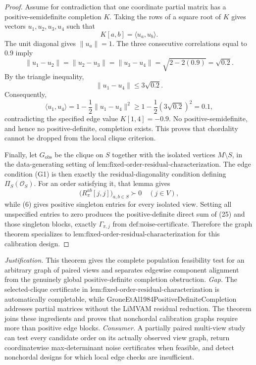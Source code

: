 \documentclass{article}
\begin{document}
\begin{proof}
Assume for contradiction that one coordinate partial matrix has a positive-semidefinite completion \(K\).  Taking the rows of a square root of \(K\) gives vectors \(u_1,u_2,u_3,u_4\) such that
\[
K[a,b]=\langle u_a,u_b\rangle.
\tag{21}
\]
The unit diagonal gives \(\lVert u_a\rVert=1\).  The three consecutive correlations equal to \(0.9\) imply
\[
\lVert u_1-u_2\rVert
=\lVert u_2-u_3\rVert
=\lVert u_3-u_4\rVert
=\sqrt{2-2(0.9)}=\sqrt{0.2}.
\tag{22}
\]
By the triangle inequality,
\[
\lVert u_1-u_4\rVert\le3\sqrt{0.2}.
\tag{23}
\]
Consequently,
\[
\langle u_1,u_4\rangle
=1-\frac12\lVert u_1-u_4\rVert^2
\ge 1-\frac12(3\sqrt{0.2})^2
=0.1,
\tag{24}
\]
contradicting the specified edge value \(K[1,4]=-0.9\).  No positive-semidefinite, and hence no positive-definite, completion exists.  This proves that chordality cannot be dropped from the local clique criterion.

Finally, let \(G_{\mathrm{obs}}\) be the clique on \(S\) together with the isolated vertices \(M\setminus S\), in the data-generating setting of \(\text{lem:fixed-order-residual-characterization}\).  The edge condition (G1) is then exactly the residual-diagonality condition defining \(\Pi_S(\mathcal O_S)\).  For an order satisfying it, that lemma gives
\[
\bigl(R_\pi^{ab}[j,j]\bigr)_{a,b\in S}\succ0
\quad(j\in V),
\tag{25}
\]
while (6) gives positive singleton entries for every isolated view.  Setting all unspecified entries to zero produces the positive-definite direct sum of (25) and those singleton blocks, exactly \(\Gamma_{\pi,j}\) from \(\text{def:noise-certificate}\).  Therefore the graph theorem specializes to \(\text{lem:fixed-order-residual-characterization}\) for this calibration design.
\end{proof}
\par\smallskip\noindent \textit{Justification.} This theorem gives the complete population feasibility test for an arbitrary graph of paired views and separates edgewise component alignment from the genuinely global positive-definite completion obstruction. \textit{Gap.} The selected-clique certificate in \(\text{lem:fixed-order-residual-characterization}\) is automatically completable, while GroneEtAl1984PositiveDefiniteCompletion addresses partial matrices without the LiMVAM residual reduction.  The theorem joins these ingredients and proves that nonchordal calibration graphs require more than positive edge blocks. \textit{Consumer.} A partially paired multi-view study can test every candidate order on its actually observed view graph, return coordinatewise max-determinant noise certificates when feasible, and detect nonchordal designs for which local edge checks are insufficient.
\end{document}
